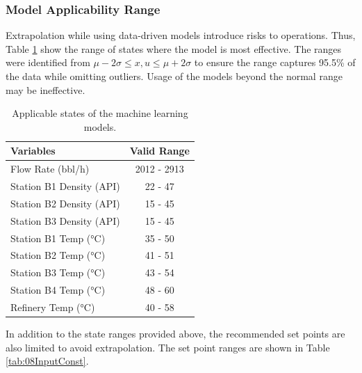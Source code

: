 \subsubsection{Model Applicability Range}
Extrapolation while using data-driven models introduce risks to operations. Thus, Table \ref{tab:08StateConst} show the range of states where the model is most effective. The ranges were identified from $\mu - 2\sigma \leq x, u \leq \mu + 2\sigma$ to ensure the range captures 95.5\% of the data while omitting outliers. Usage of the models beyond the normal range may be ineffective.

\begin{table}[h]
    \centering
    {
    \begin{tabular}{ p{5cm} | c }
        Variables                         &  Valid Range           \\
        \hline
        Flow Rate (bbl/h)                       &      2012 - 2913       \\
        Station B1 Density (API)                  &      22 - 47           \\ 
        Station B2 Density (API)                       &      15 - 45           \\
        Station B3 Density (API)                      &      15 - 45           \\
        Station B1 Temp (°C)                      &      35 - 50           \\
        Station B2 Temp (°C)                           &      41 - 51           \\
        Station B3 Temp (°C)                          &      43 - 54           \\
        Station B4 Temp (°C)                   &      48 - 60           \\
        Refinery Temp  (°C)                &      40 - 58           \\
    \end{tabular}}
    \caption{Applicable states of the machine learning models.}
    \label{tab:08StateConst}
\end{table}

In addition to the state ranges provided above, the recommended set points are also limited to avoid extrapolation.  The set point ranges are shown in Table \ref{tab:08InputConst}.

